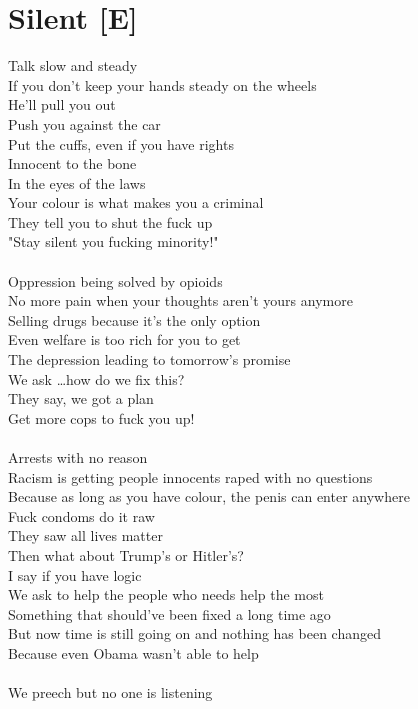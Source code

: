 \documentclass[12pt, b5paper, oneside]{book}
\begin{document}
\section{Silent [E]}
Talk slow and steady 
\\If you don't keep your hands steady on the wheels
\\He'll pull you out 
\\Push you against the car 
\\Put the cuffs, even if you have rights 
\\Innocent to the bone 
\\In the eyes of the laws
\\Your colour is what makes you a criminal
\\They tell you to shut the fuck up
\\"Stay silent you fucking minority!"
%
\\\\Oppression being solved by opioids 
\\No more pain when your thoughts aren't yours anymore
\\Selling drugs because it's the only option 
\\Even welfare is too rich for you to get 
\\The depression leading to tomorrow's promise 
\\We ask \dots how do we fix this?
\\They say, we got a plan 
\\Get more cops to fuck you up!
%
\\\\Arrests with no reason 
\\Racism is getting people innocents raped with no questions 
\\Because as long as you have colour, the penis can enter anywhere 
\\Fuck condoms do it raw 
\\They saw all lives matter 
\\Then what about Trump's or Hitler's?
\\I say if you have logic 
\\We ask to help the people who needs help the most 
\\Something that should've been fixed a long time ago 
\\But now time is still going on and nothing has been changed 
\\Because even Obama wasn't able to help 
%
\\\\We preech but no one is listening 
\end{document}
